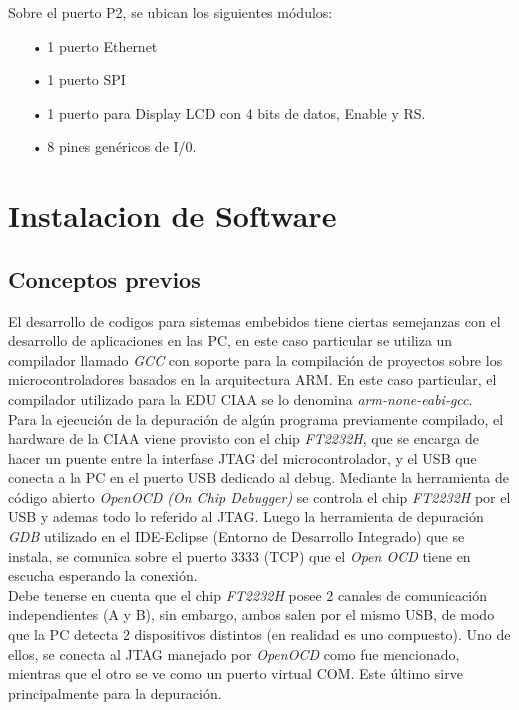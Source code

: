 \documentclass[12pt,letterpaper]{article}
\begin{document}
Sobre el puerto P2, se ubican los siguientes módulos:

\begin{enumerate}
\item[•] 1 puerto Ethernet
\item[•] 1 puerto SPI
\item[•] 1 puerto para Display LCD con 4 bits de datos, Enable y RS.
\item[•] 8 pines genéricos de I/0.
\end{enumerate}

\section{Instalacion de Software}

\subsection{Conceptos previos}
El desarrollo de codigos para sistemas embebidos tiene ciertas semejanzas con el desarrollo de aplicaciones en las PC, en este caso particular se utiliza un compilador llamado \textit{GCC} con soporte para la compilación de proyectos sobre los microcontroladores basados en la arquitectura ARM. En este caso particular, el compilador utilizado para la EDU CIAA se lo denomina \textit{arm-none-eabi-gcc}.
 \\
 
Para la ejecución de la depuración de algún programa previamente compilado, el hardware de la CIAA viene provisto con el chip \textit{FT2232H}, que se encarga de hacer un puente entre la interfase JTAG del microcontrolador, y el USB que conecta a la PC en el puerto USB dedicado al debug. Mediante la herramienta de código abierto \textit{OpenOCD (On Chip Debugger)} se controla el chip \textit{FT2232H} por el USB y ademas todo lo referido al JTAG. Luego la herramienta de depuración \textit{GDB} utilizado en el IDE-Eclipse (Entorno de Desarrollo Integrado) que se instala, se comunica sobre el puerto 3333 (TCP) que el \textit{Open OCD} tiene en escucha esperando la conexión.
 \\
 
Debe tenerse en cuenta que el chip \textit{FT2232H} posee 2 canales de comunicación independientes (A y B), sin embargo, ambos salen por el mismo USB, de modo que la PC detecta 2 dispositivos distintos (en realidad es uno compuesto). Uno de ellos, se conecta al JTAG manejado por \textit{OpenOCD} como fue mencionado, mientras que el otro se ve como un puerto virtual COM. Este último sirve principalmente para la depuración.
 \\
\end{document}
